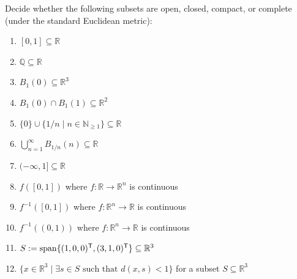 \begin{exercise}
\label{ex:topological_properties_table}
Decide whether the following subsets are open, closed, compact, or complete (under the standard Euclidean metric):
\begin{enumerate}[label=\textbf{(\alph*)}]
  \item $[0,1] \subseteq \mathbb{R}$
  \item $\mathbb{Q} \subseteq \mathbb{R}$
  \item $B_1(0) \subseteq \mathbb{R}^3$
  \item $B_1(0) \cap B_1(1) \subseteq \mathbb{R}^2$
  \item $\{0\} \cup \{1/n \mid n \in \mathbb{N}_{\ge 1}\} \subseteq \mathbb{R}$
  \item $\bigcup_{n=1}^\infty B_{1/n}(n) \subseteq \mathbb{R}$
  \item $(-\infty, 1] \subseteq \mathbb{R}$
  \item $f([0,1])$ where $f : \mathbb{R} \to \mathbb{R}^n$ is continuous
  \item $f^{-1}([0,1])$ where $f : \mathbb{R}^n \to \mathbb{R}$ is continuous
  \item $f^{-1}((0,1))$ where $f : \mathbb{R}^n \to \mathbb{R}$ is continuous
  \item $S := \operatorname{span}\{(1,0,0)^{\mathsf{T}}, (3,1,0)^{\mathsf{T}}\} \subseteq \mathbb{R}^3$
  \item $\{x \in \mathbb{R}^3 \mid \exists s \in S \text{ such that } d(x, s) < 1\}$ for a subset $S \subseteq \mathbb{R}^3$
\end{enumerate}
\end{exercise}

